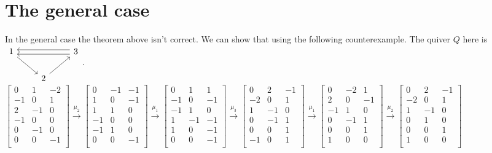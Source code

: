\section{The general case}
\indent In the general case the theorem above isn't correct. We can show that using the following counterexample. The quiver $Q$ here is $\begin{tikzcd}
1\arrow[rd] &  & 3\lefttwicedoublearrow\\
 & 2\arrow[ur]
\end{tikzcd}$.\\
$\begin{bmatrix} 
0 &1 & -2\\
-1 & 0 & 1\\
2 & -1 & 0\\
-1 & 0 & 0\\
0 & -1 & 0\\
0 & 0 & -1\\
\end{bmatrix}\overset{\mu_2}{\to}\begin{bmatrix} 
0 &-1 & -1\\
1 & 0 & -1\\
1 & 1 & 0\\
-1 & 0 & 0\\
-1 & 1 & 0\\
0 & 0 & -1\\
\end{bmatrix}\overset{\mu_1}{\to}\begin{bmatrix} 
0 &1 & 1\\
-1 & 0 & -1\\
-1 & 1 & 0\\
1 & -1 & -1\\
1 & 0 & -1\\
0 & 0 & -1\\
\end{bmatrix}\overset{\mu_3}{\to}\begin{bmatrix} 
0 &2 & -1\\
-2 & 0 & 1\\
1 & -1 & 0\\
0 & -1 & 1\\
0 & 0 & 1\\
-1 & 0 & 1\\
\end{bmatrix}\overset{\mu_1}{\to}\begin{bmatrix} 
0 &-2 & 1\\
2 & 0 & -1\\
-1 & 1 & 0\\
0 & -1 & 1\\
0 & 0 & 1\\
1 & 0 & 0\\
\end{bmatrix}\overset{\mu_2}{\to}\begin{bmatrix} 
0 &2 & -1\\
-2 & 0 & 1\\
1 & -1 & 0\\
0 & 1 & 0\\
0 & 0 & 1\\
1 & 0 & 0\\
\end{bmatrix}$\\
